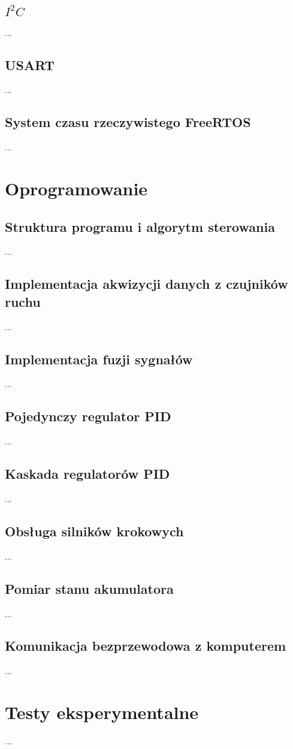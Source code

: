\subsection{$I^{2}C$}
...

\subsection{USART}
...

\subsection{System czasu rzeczywistego FreeRTOS}
...

\section{Oprogramowanie}

\subsection{Struktura programu i algorytm sterowania}
...

\subsection{Implementacja akwizycji danych z czujników ruchu}
...

\subsection{Implementacja fuzji sygnałów}
...

\subsection{Pojedynczy regulator PID}
...

\subsection{Kaskada regulatorów PID}
...

\subsection{Obsługa silników krokowych}
...

\subsection{Pomiar stanu akumulatora}
...

\subsection{Komunikacja bezprzewodowa z komputerem}
...

\section{Testy eksperymentalne}
...